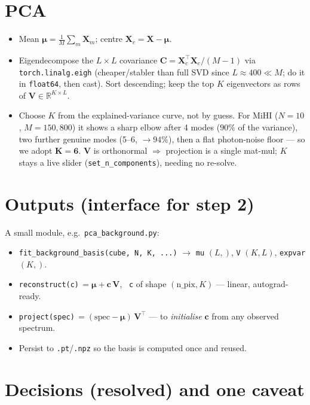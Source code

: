 \documentclass[10pt,a4paper]{article}
\newcommand{\co}[1]{{\small\texttt{#1}}}
\begin{document}
\section{PCA}

\begin{itemize}
\item Mean $\boldsymbol\mu=\tfrac1M\sum_m\mathbf X_m$; centre $\mathbf X_c=\mathbf X-\boldsymbol\mu$.
\item Eigendecompose the $L\times L$ covariance $\mathbf C=\mathbf X_c^{\!\top}\mathbf X_c/(M{-}1)$ via \co{torch.linalg.eigh} (cheaper/stabler than full SVD since $L\!\approx\!400\ll M$; do it in \co{float64}, then cast). Sort descending; keep the top $K$ eigenvectors as rows of $\mathbf V\in\mathbb R^{K\times L}$.
\item Choose $K$ from the explained-variance curve, not by guess. For MiHI ($N{=}10$, $M{=}150{,}800$) it shows a sharp elbow after 4 modes ($90\%$ of the variance), two further genuine modes (5--6, $\to94\%$), then a flat photon-noise floor --- so we adopt $\boldsymbol{K=6}$. $\mathbf V$ is orthonormal $\Rightarrow$ projection is a single mat-mul; $K$ stays a live slider (\co{set\_n\_components}), needing no re-solve.
\end{itemize}

\section{Outputs (interface for step 2)}

A small module, e.g.\ \co{pca\_background.py}:
\begin{itemize}
\item \co{fit\_background\_basis(cube, N, K, ...)} $\rightarrow$ \co{mu} $(L,)$, \co{V} $(K,L)$, \co{expvar} $(K,)$.
\item \co{reconstruct(c)}\,$=\boldsymbol\mu+\mathbf c\,\mathbf V$, \ \co{c} of shape $(\text{n\_pix},K)$ --- linear, autograd-ready.
\item \co{project(spec)}\,$=(\text{spec}-\boldsymbol\mu)\,\mathbf V^{\!\top}$ --- to \emph{initialise} $\mathbf c$ from any observed spectrum.
\item Persist to \co{.pt}/\co{.npz} so the basis is computed once and reused.
\end{itemize}

\section{Decisions (resolved) and one caveat}
\end{document}
